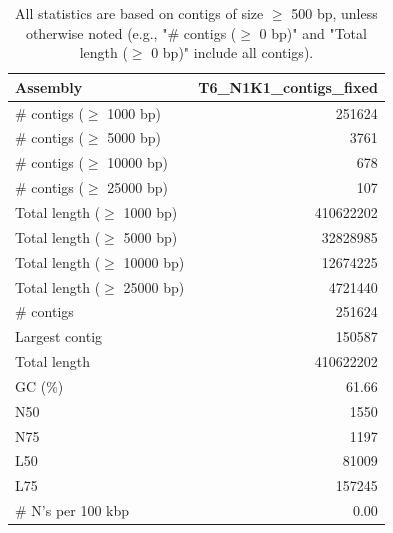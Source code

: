 \documentclass[12pt,a4paper]{article}
\begin{document}
\begin{table}[ht]
\begin{center}
\caption{All statistics are based on contigs of size $\geq$ 500 bp, unless otherwise noted (e.g., "\# contigs ($\geq$ 0 bp)" and "Total length ($\geq$ 0 bp)" include all contigs).}
\begin{tabular}{|l*{1}{|r}|}
\hline
Assembly & T6\_N1K1\_contigs\_fixed \\ \hline
\# contigs ($\geq$ 1000 bp) & 251624 \\ \hline
\# contigs ($\geq$ 5000 bp) & 3761 \\ \hline
\# contigs ($\geq$ 10000 bp) & 678 \\ \hline
\# contigs ($\geq$ 25000 bp) & 107 \\ \hline
Total length ($\geq$ 1000 bp) & 410622202 \\ \hline
Total length ($\geq$ 5000 bp) & 32828985 \\ \hline
Total length ($\geq$ 10000 bp) & 12674225 \\ \hline
Total length ($\geq$ 25000 bp) & 4721440 \\ \hline
\# contigs & 251624 \\ \hline
Largest contig & 150587 \\ \hline
Total length & 410622202 \\ \hline
GC (\%) & 61.66 \\ \hline
N50 & 1550 \\ \hline
N75 & 1197 \\ \hline
L50 & 81009 \\ \hline
L75 & 157245 \\ \hline
\# N's per 100 kbp & 0.00 \\ \hline
\end{tabular}
\end{center}
\end{table}
\end{document}
